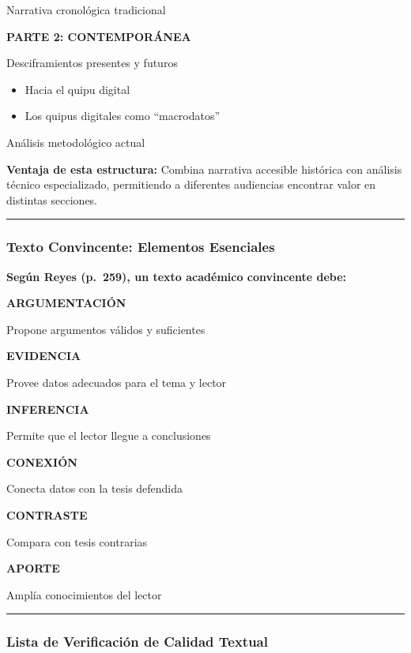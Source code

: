 \documentclass[
  11pt,
]{beaner}
\providecommand{\tightlist}{%
  \setlength{\itemsep}{0pt}\setlength{\parskip}{0pt}}
\begin{document}
{Narrativa cronológica tradicional}

\textbf{PARTE 2: CONTEMPORÁNEA}

Desciframientos presentes y futuros

\begin{itemize}
\tightlist
\item
  Hacia el quipu digital
\item
  Los quipus digitales como ``macrodatos''
\end{itemize}

{Análisis metodológico actual}

\textbf{Ventaja de esta estructura:} Combina narrativa accesible
histórica con análisis técnico especializado, permitiendo a diferentes
audiencias encontrar valor en distintas secciones.

\begin{center}\rule{0.5\linewidth}{0.5pt}\end{center}

\subsubsection{Texto Convincente: Elementos
Esenciales}\label{texto-convincente-elementos-esenciales}

\textbf{Según Reyes (p.~259), un texto académico convincente debe:}

\textbf{ARGUMENTACIÓN}

Propone argumentos válidos y suficientes

\textbf{EVIDENCIA}

Provee datos adecuados para el tema y lector

\textbf{INFERENCIA}

Permite que el lector llegue a conclusiones

\textbf{CONEXIÓN}

Conecta datos con la tesis defendida

\textbf{CONTRASTE}

Compara con tesis contrarias

\textbf{APORTE}

Amplía conocimientos del lector

\begin{center}\rule{0.5\linewidth}{0.5pt}\end{center}

\subsubsection{Lista de Verificación de Calidad
Textual}\label{lista-de-verificaciuxf3n-de-calidad-textual}
\end{document}
